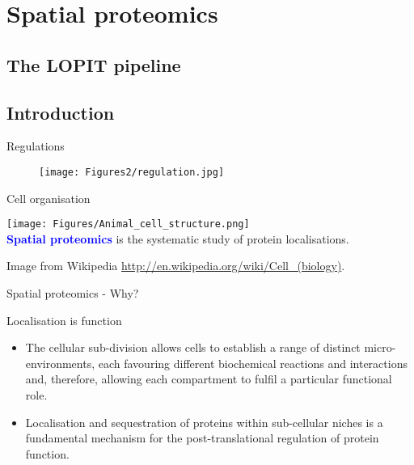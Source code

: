\section{Spatial proteomics}

\subsection{The LOPIT pipeline}

\subsection*{Introduction}
\label{sec:spintro}

\begin{frame}{Regulations}
  \begin{figure}[h]
    \centering
    \texttt{[image: Figures2/regulation.jpg]}
  \end{figure}
\end{frame}

\label{sec:spspatprot}

\begin{frame}{Cell organisation}
  \begin{center}
    \texttt{[image: Figures/Animal\_cell\_structure.png]} \\
    \textbf{\textcolor{Blue}{Spatial proteomics}} is the systematic
    study of protein localisations.
  \end{center}

  \tiny Image from Wikipedia
  \url{http://en.wikipedia.org/wiki/Cell_(biology)}.
\end{frame}


\begin{frame}{Spatial proteomics - Why?}
  \begin{block}{Localisation is function} 
    \begin{itemize}
    \item The cellular sub-division allows cells to establish a range
      of distinct micro-environments, each favouring different
      biochemical reactions and interactions and, therefore, allowing
      each compartment to fulfil a particular functional role.          
    \item Localisation and sequestration of proteins within
      sub-cellular niches is a fundamental mechanism for the
      post-translational regulation of protein function.         
    \end{itemize}
  \end{block}    
\end{frame}

